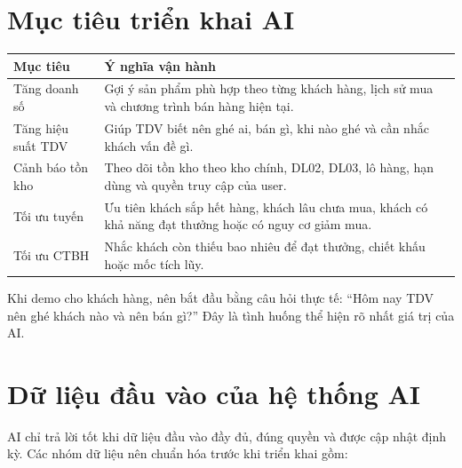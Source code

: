 \documentclass[12pt,a4paper,oneside,openany]{book}
\begin{document}
\chapter{Mục tiêu triển khai AI}

\begin{longtable}{p{4cm}p{10cm}}
\toprule
\textbf{Mục tiêu} & \textbf{Ý nghĩa vận hành} \\
\midrule
Tăng doanh số & Gợi ý sản phẩm phù hợp theo từng khách hàng, lịch sử mua và chương trình bán hàng hiện tại. \\
Tăng hiệu suất TDV & Giúp TDV biết nên ghé ai, bán gì, khi nào ghé và cần nhắc khách vấn đề gì. \\
Cảnh báo tồn kho & Theo dõi tồn kho theo kho chính, DL02, DL03, lô hàng, hạn dùng và quyền truy cập của user. \\
Tối ưu tuyến & Ưu tiên khách sắp hết hàng, khách lâu chưa mua, khách có khả năng đạt thưởng hoặc có nguy cơ giảm mua. \\
Tối ưu CTBH & Nhắc khách còn thiếu bao nhiêu để đạt thưởng, chiết khấu hoặc mốc tích lũy. \\
\bottomrule
\end{longtable}

\begin{tcolorbox}[tipBox]
Khi demo cho khách hàng, nên bắt đầu bằng câu hỏi thực tế: ``Hôm nay TDV nên ghé khách nào và nên bán gì?'' Đây là tình huống thể hiện rõ nhất giá trị của AI.
\end{tcolorbox}

\chapter{Dữ liệu đầu vào của hệ thống AI}

AI chỉ trả lời tốt khi dữ liệu đầu vào đầy đủ, đúng quyền và được cập nhật định kỳ. Các nhóm dữ liệu nên chuẩn hóa trước khi triển khai gồm:
\end{document}
